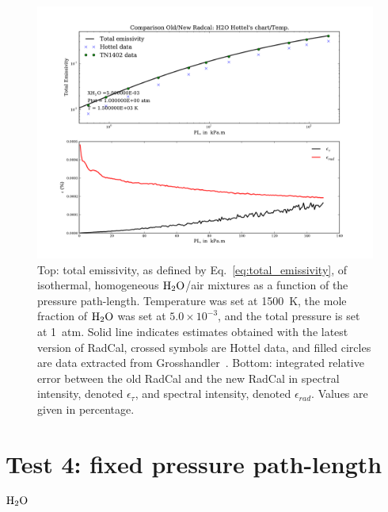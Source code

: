 \begin{figure}
\includegraphics[width=\textwidth]{Figures/Test3_H2O_Hottel.pdf}
\caption{Top: total emissivity, as defined by Eq.~\ref{eq:total_emissivity}, of isothermal, homogeneous ${\rm H_2O}$/air mixtures as a function of the pressure path-length. Temperature was set at 1500~K, the mole fraction of ${\rm H_2O}$ was set at $5.0 \times 10^{-3}$, and the total pressure is set at 1~atm. Solid line indicates estimates obtained with the latest version of RadCal, crossed symbols are Hottel data, and filled circles are data extracted from Grosshandler~\cite{Grosshandler1993}. Bottom: integrated relative error between the old RadCal and the new RadCal in spectral intensity, denoted $\epsilon_{\tau}$, and spectral intensity, denoted $\epsilon_{rad}$. Values are given in percentage.\label{fig:Test3_H2O_Hottel}}
\end{figure}


\section{Test 4: fixed pressure path-length {$\rm H_2O$}}

